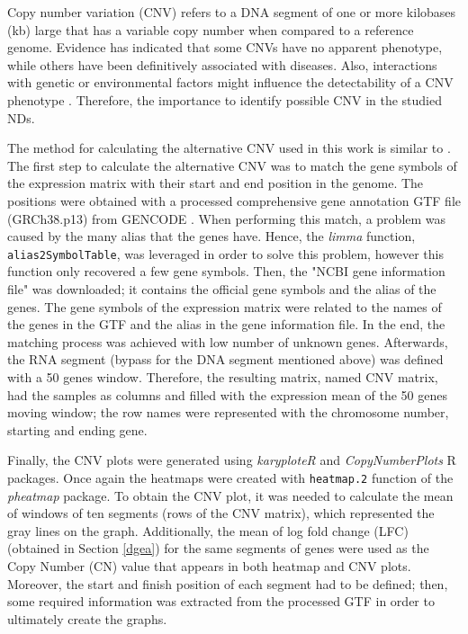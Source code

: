 Copy number variation (CNV) refers to a DNA segment of one or more kilobases (kb) large that has a variable copy number when compared to a reference genome. Evidence has indicated that some CNVs have no apparent phenotype, while others have been definitively associated with diseases. Also, interactions with genetic or environmental factors might influence the detectability of a CNV phenotype \cite{clancy}. Therefore, the importance to identify possible CNV in the studied NDs.

The method for calculating the alternative CNV used in this work is similar to \cite{patel}. The first step to calculate the alternative CNV was to match the gene symbols of the expression matrix with their start and end position in the genome. The positions were obtained with a processed comprehensive gene annotation GTF file (GRCh38.p13) from GENCODE \cite{gencode}. When performing this match, a problem was caused by the many alias that the genes have. Hence, the \textit{limma} function, \verb|alias2SymbolTable|, was leveraged in order to solve this problem, however this function only recovered a few gene symbols. Then, the "NCBI gene information file" was downloaded; it contains the official gene symbols and the alias of the genes. The gene symbols of the expression matrix were related to the names of the genes in the GTF and the alias in the gene information file. In the end, the matching process was achieved with low number of unknown genes. Afterwards, the RNA segment (bypass for the DNA segment mentioned above) was defined with a 50 genes window. Therefore, the resulting matrix, named CNV matrix, had the samples as columns and filled with the expression mean of the 50 genes moving window; the row names were represented with the chromosome number, starting and ending gene.

Finally, the CNV plots were generated using \textit{karyploteR} \cite{karyoploter} and \textit{CopyNumberPlots} \cite{cnplots} R packages. Once again the heatmaps were created with \verb|heatmap.2| function of the \textit{pheatmap} package. To obtain the CNV plot, it was needed to calculate the mean of windows of ten segments (rows of the CNV matrix), which represented the gray lines on the graph. Additionally, the mean of log fold change (LFC) (obtained in Section \ref{dgea}) for the same segments of genes were used as the Copy Number (CN) value that appears in both heatmap and CNV plots. Moreover, the start and finish position of each segment had to be defined; then, some required information was extracted from the processed GTF in order to ultimately create the graphs.

